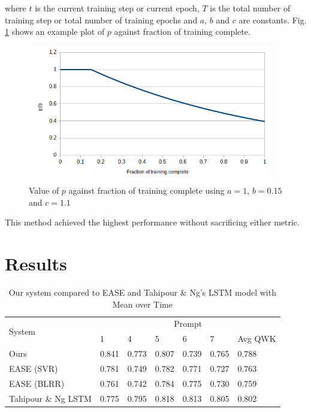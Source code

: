 where \(t\) is the current training step or current epoch, \(T\) is the
total number of training step or total number of training epochs and
\(a\), \(b\) and \(c\) are constants. Fig. \ref{fig:p} shows an example
plot of \(p\) against fraction of training complete.

\begin{figure}[h!]
\centering
\includegraphics[height=6cm]{p-value}
\caption{Value of $p$ against fraction of training complete using $a=1$, $b=0.15$ and $c=1.1$}
\label{fig:p}
\end{figure}

This method achieved the highest performance without sacrificing either
metric.

\hypertarget{results}{%
\section{Results}\label{results}}

\begin{table}[H]
\caption{Our system compared to EASE and Tahipour \& Ng's LSTM model with Mean over Time}
\begin{tabular}{|l|llllll|}
\hline
\multirow{2}{*}{System} & \multicolumn{6}{c|}{Prompt}                                                                                                                              \\ \cline{2-7} 
                        & \multicolumn{1}{l|}{1}     & \multicolumn{1}{l|}{4}     & \multicolumn{1}{l|}{5}     & \multicolumn{1}{l|}{6}     & \multicolumn{1}{l|}{7}     & Avg QWK \\ \hline
Ours                    & \multicolumn{1}{l|}{0.841} & \multicolumn{1}{l|}{0.773} & \multicolumn{1}{l|}{0.807} & \multicolumn{1}{l|}{0.739} & \multicolumn{1}{l|}{0.765} & 0.788   \\ \hline
EASE (SVR)              & \multicolumn{1}{l|}{0.781} & \multicolumn{1}{l|}{0.749} & \multicolumn{1}{l|}{0.782} & \multicolumn{1}{l|}{0.771} & \multicolumn{1}{l|}{0.727} & 0.763   \\ \hline
EASE (BLRR)             & \multicolumn{1}{l|}{0.761} & \multicolumn{1}{l|}{0.742} & \multicolumn{1}{l|}{0.784} & \multicolumn{1}{l|}{0.775} & \multicolumn{1}{l|}{0.730} & 0.759   \\ \hline
Tahipour \& Ng LSTM     & \multicolumn{1}{l|}{0.775} & \multicolumn{1}{l|}{0.795} & \multicolumn{1}{l|}{0.818} & \multicolumn{1}{l|}{0.813} & \multicolumn{1}{l|}{0.805} & 0.802   \\ \hline
\end{tabular}
\end{table}

